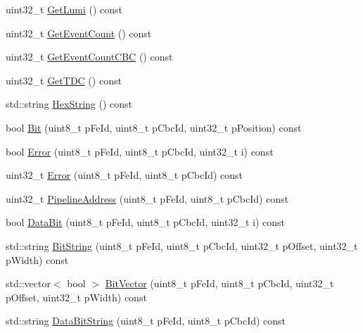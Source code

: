 \begin{DoxyCompactItemize}
\item 
uint32\-\_\-t \hyperlink{class_ph2___hw_interface_1_1_event_ae5af75e033d2eb6d76a039e859a9ce86}{Get\-Lumi} () const 
\item 
uint32\-\_\-t \hyperlink{class_ph2___hw_interface_1_1_event_aaebf08f816e8a98f424ba8ab25e32231}{Get\-Event\-Count} () const 
\item 
uint32\-\_\-t \hyperlink{class_ph2___hw_interface_1_1_event_a620592c831036eae724c37db45ca0765}{Get\-Event\-Count\-C\-B\-C} () const 
\item 
uint32\-\_\-t \hyperlink{class_ph2___hw_interface_1_1_event_a2c193b4b2bdb35267f63d03cc684e7b1}{Get\-T\-D\-C} () const 
\item 
std\-::string \hyperlink{class_ph2___hw_interface_1_1_event_a1dd8d9cc8a8169df80518d57b1075d2c}{Hex\-String} () const 
\item 
bool \hyperlink{class_ph2___hw_interface_1_1_event_a5b542b0d98a413feef14cc57cff250bf}{Bit} (uint8\-\_\-t p\-Fe\-Id, uint8\-\_\-t p\-Cbc\-Id, uint32\-\_\-t p\-Position) const 
\item 
bool \hyperlink{class_ph2___hw_interface_1_1_event_ae0242a4b78e3da2959a2bcfb8adb86f9}{Error} (uint8\-\_\-t p\-Fe\-Id, uint8\-\_\-t p\-Cbc\-Id, uint32\-\_\-t i) const 
\item 
uint32\-\_\-t \hyperlink{class_ph2___hw_interface_1_1_event_ab3bbc58be7f96ba0dbc1721eb90d4380}{Error} (uint8\-\_\-t p\-Fe\-Id, uint8\-\_\-t p\-Cbc\-Id) const 
\item 
uint32\-\_\-t \hyperlink{class_ph2___hw_interface_1_1_event_a2597189e1c09b65433df4489f5afbf56}{Pipeline\-Address} (uint8\-\_\-t p\-Fe\-Id, uint8\-\_\-t p\-Cbc\-Id) const 
\item 
bool \hyperlink{class_ph2___hw_interface_1_1_event_a3e93e6f16944f443caffd2df81262fbe}{Data\-Bit} (uint8\-\_\-t p\-Fe\-Id, uint8\-\_\-t p\-Cbc\-Id, uint32\-\_\-t i) const 
\item 
std\-::string \hyperlink{class_ph2___hw_interface_1_1_event_a67261ba2ea976e1c265c8aa7fe1a4b2d}{Bit\-String} (uint8\-\_\-t p\-Fe\-Id, uint8\-\_\-t p\-Cbc\-Id, uint32\-\_\-t p\-Offset, uint32\-\_\-t p\-Width) const 
\item 
std\-::vector$<$ bool $>$ \hyperlink{class_ph2___hw_interface_1_1_event_ab83e11f21873bd5beebd1049671ce3da}{Bit\-Vector} (uint8\-\_\-t p\-Fe\-Id, uint8\-\_\-t p\-Cbc\-Id, uint32\-\_\-t p\-Offset, uint32\-\_\-t p\-Width) const 
\item 
std\-::string \hyperlink{class_ph2___hw_interface_1_1_event_adb005c7fbcd56f6cb66a4b83b185886b}{Data\-Bit\-String} (uint8\-\_\-t p\-Fe\-Id, uint8\-\_\-t p\-Cbc\-Id) const 

\end{DoxyCompactItemize}
